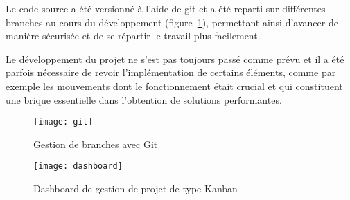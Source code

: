 		Le code source a été versionné à l'aide de git et a été reparti sur différentes branches au cours du développement (figure~\ref{fig:git}), permettant ainsi d'avancer de manière sécurisée et de se répartir le travail plus facilement.
		
		Le développement du projet ne s'est pas toujours passé comme prévu et il a été parfois nécessaire de revoir l'implémentation de certains éléments, comme par exemple les mouvements dont le fonctionnement était crucial et qui constituent une brique essentielle dans l'obtention de solutions performantes.
		
		\begin{figure}[h!]
			\centering
			\texttt{[image: git]}
			\caption{Gestion de branches avec Git}
			\label{fig:git}
		\end{figure}

		\begin{figure}[h!]
			\centering
			\texttt{[image: dashboard]}
			\caption{Dashboard de gestion de projet de type Kanban}
			\label{fig:dashboard}
		\end{figure}

